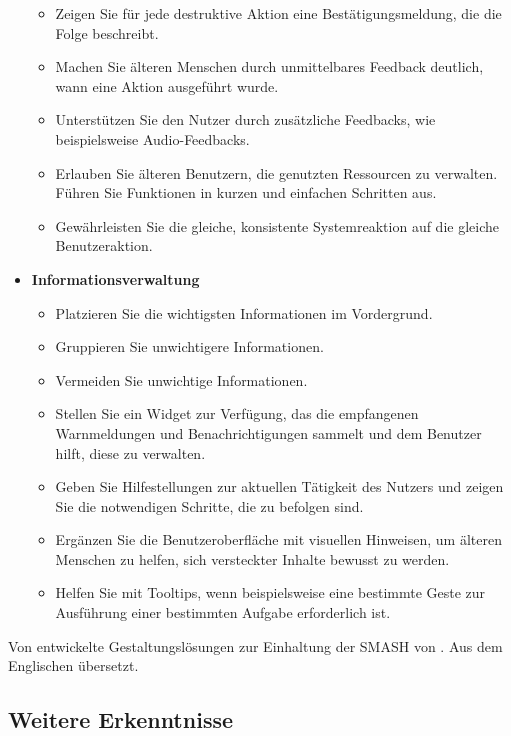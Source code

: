 \begin{table}[p]
\begin{itemize}[label={}]
\begin{itemize}[nosep]
			\item Zeigen Sie für jede destruktive Aktion eine Bestätigungsmeldung, die die Folge beschreibt.
			\item Machen Sie älteren Menschen durch unmittelbares Feedback deutlich, wann eine Aktion ausgeführt wurde.
			\item Unterstützen Sie den Nutzer durch zusätzliche Feedbacks, wie beispielsweise Audio-Feedbacks.
			\item Erlauben Sie älteren Benutzern, die genutzten Ressourcen zu verwalten. Führen Sie Funktionen in kurzen und einfachen Schritten aus.
			\item Gewährleisten Sie die gleiche, konsistente Systemreaktion auf die gleiche Benutzeraktion.
		\end{itemize}
		\item \textbf{Informationsverwaltung}
		\begin{itemize}[nosep]
			\item Platzieren Sie die wichtigsten Informationen im Vordergrund.
			\item Gruppieren Sie unwichtigere Informationen.
			\item Vermeiden Sie unwichtige Informationen.
			\item Stellen Sie ein Widget zur Verfügung, das die empfangenen Warnmeldungen und Benachrichtigungen sammelt und dem Benutzer hilft, diese zu verwalten.
			\item Geben Sie Hilfestellungen zur aktuellen Tätigkeit des Nutzers und zeigen Sie die notwendigen Schritte, die zu befolgen sind.
			\item Ergänzen Sie die Benutzeroberfläche mit visuellen Hinweisen, um älteren Menschen zu helfen, sich versteckter Inhalte bewusst zu werden.
			\item Helfen Sie mit Tooltips, wenn beispielsweise eine bestimmte Geste zur Ausführung einer bestimmten Aufgabe erforderlich ist.
		\end{itemize}
	\end{itemize}
	\caption{\label{tab:smash-conforming-design-solutions}Von \textcite{Salman:2018:Usability-Evaluation-of-the-Smartphone} entwickelte Gestaltungslösungen zur Einhaltung der \acf{SMASH} von \textcite{Inostroza:2016:Developing-SMASH:-A-set-of-SMArtphones}. Aus dem Englischen übersetzt.}
\end{table}

\subsection{Weitere Erkenntnisse}

